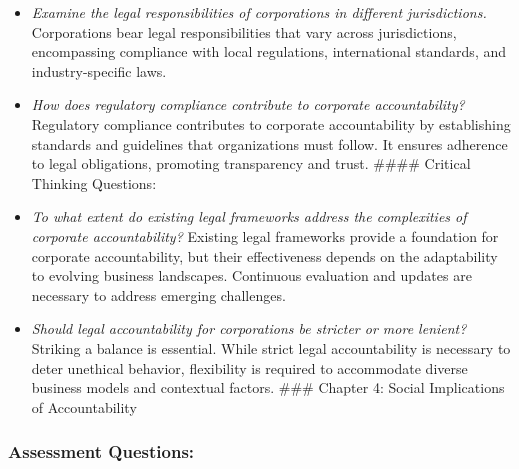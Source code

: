\documentclass[
  letterpaper,
  DIV=11,
  numbers=noendperiod]{scrreprt}
\begin{document}
\begin{itemize}
\item
  \emph{Examine the legal responsibilities of corporations in different
  jurisdictions.} Corporations bear legal responsibilities that vary
  across jurisdictions, encompassing compliance with local regulations,
  international standards, and industry-specific laws.
\item
  \emph{How does regulatory compliance contribute to corporate
  accountability?} Regulatory compliance contributes to corporate
  accountability by establishing standards and guidelines that
  organizations must follow. It ensures adherence to legal obligations,
  promoting transparency and trust. \#\#\#\# Critical Thinking
  Questions:
\item
  \emph{To what extent do existing legal frameworks address the
  complexities of corporate accountability?} Existing legal frameworks
  provide a foundation for corporate accountability, but their
  effectiveness depends on the adaptability to evolving business
  landscapes. Continuous evaluation and updates are necessary to address
  emerging challenges.
\item
  \emph{Should legal accountability for corporations be stricter or more
  lenient?} Striking a balance is essential. While strict legal
  accountability is necessary to deter unethical behavior, flexibility
  is required to accommodate diverse business models and contextual
  factors. \#\#\# Chapter 4: Social Implications of Accountability
\end{itemize}

\subsubsection{Assessment Questions:}\label{assessment-questions-11}
\end{document}
